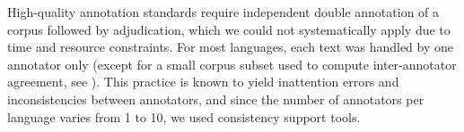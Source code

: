 \documentclass[output=paper,
modfonts,
]{langscibook}
\begin{document}
High-quality annotation standards require independent double annotation of a corpus followed by adjudication, which we could not systematically apply due to time and resource constraints. For most languages, each text was handled by one annotator only (except for a small corpus subset used to compute inter-annotator agreement, see ). 
This practice is known %
to yield inattention errors and inconsistencies between annotators, and since the number of annotators per language varies from 1 to 10, we used consistency support tools.

\end{document}
